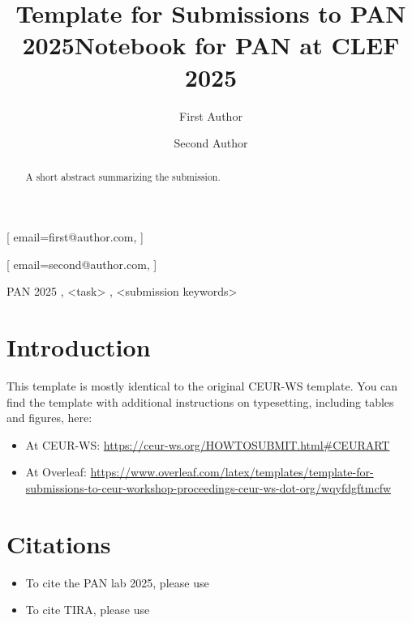 \documentclass[]{ceurart}
\begin{document}


\title{Template for Submissions to PAN 2025}
\title[mode=sub]{Notebook for PAN at CLEF 2025}

\author[1]{First Author}[%
email=first@author.com,
]
\address[1]{Affiliation, Address, City, Country}

\author[2]{Second Author}[%
email=second@author.com,
]
\address[2]{Affiliation, Address, City, Country}

\begin{abstract}
  A short abstract summarizing the submission.
\end{abstract}

\begin{keywords}
  PAN 2025 \sep
  <task> \sep
  <submission keywords>
\end{keywords}

\maketitle

\section{Introduction}

This template is mostly identical to the original CEUR-WS template. You can find the template with additional instructions on typesetting, including tables and figures, here:
\begin{itemize}
  \item At CEUR-WS: \url{https://ceur-ws.org/HOWTOSUBMIT.html#CEURART}
  \item At Overleaf: \url{https://www.overleaf.com/latex/templates/template-for-submissions-to-ceur-workshop-proceedings-ceur-ws-dot-org/wqyfdgftmcfw}
\end{itemize}

\section{Citations}

\begin{itemize}
  \item To cite the PAN lab 2025, please use~\cite{bevendorff:2025}
  \item To cite TIRA, please use~\cite{froebe:2023b}
\end{itemize}


% 
\end{document}
